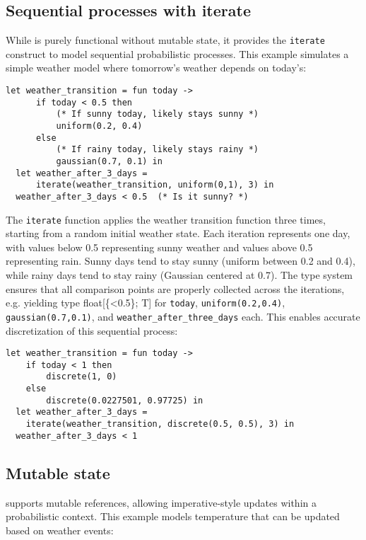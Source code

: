 \documentclass[acmsmall,screen,dvipsnames,x11names,nonacm,anonymous,review]{acmart}
\newcommand{\codetype}[1]{\textcolor{typecolor}{\ttfamily\small#1}}
\newcommand{\ft}[1]{\codetype{float[\{#1\}; T]}}        %
\begin{document}
\subsection{Sequential processes with iterate}

While \Slice{} is purely functional without mutable state, it provides the \texttt{iterate} construct to model sequential probabilistic processes. This example simulates a simple weather model where tomorrow's weather depends on today's:

\begin{lstlisting}[aboveskip=1em,belowskip=1em,escapechar=!]
  let weather_transition = fun today ->
      if today < 0.5 then 
          (* If sunny today, likely stays sunny *)
          uniform(0.2, 0.4)
      else  
          (* If rainy today, likely stays rainy *)
          gaussian(0.7, 0.1) in
  let weather_after_3_days = 
      iterate(weather_transition, uniform(0,1), 3) in
  weather_after_3_days < 0.5  (* Is it sunny? *)
\end{lstlisting}

\noindent The \texttt{iterate} function applies the weather transition function three times, starting from a random initial weather state. Each iteration represents one day, with values below 0.5 representing sunny weather and values above 0.5 representing rain. Sunny days tend to stay sunny (uniform between 0.2 and 0.4), while rainy days tend to stay rainy (Gaussian centered at 0.7). The type system ensures that all comparison points are properly collected across the iterations, e.g. yielding type \ft{<0.5} for \texttt{today}, \texttt{uniform(0.2,0.4)}, \texttt{gaussian(0.7,0.1)}, and \texttt{weather\_after\_three\_days} each. This enables accurate discretization of this sequential process:

\begin{lstlisting}[aboveskip=1em,belowskip=1em,escapechar=!]
  let weather_transition = fun today -> 
    if today < 1 then
        discrete(1, 0)
    else
        discrete(0.0227501, 0.97725) in
  let weather_after_3_days = 
    iterate(weather_transition, discrete(0.5, 0.5), 3) in
  weather_after_3_days < 1
\end{lstlisting}


\subsection{Mutable state}

\Slice{} supports mutable references, allowing imperative-style updates within a probabilistic context. This example models temperature that can be updated based on weather events:
\end{document}
